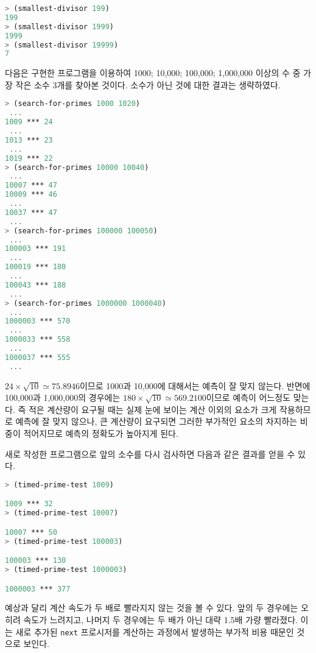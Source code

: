 
\begin{lstlisting}[language=Scheme]
> (smallest-divisor 199)
199
> (smallest-divisor 1999)
1999
> (smallest-divisor 19999)
7
\end{lstlisting}


다음은 구현한 프로그램을 이용하여 1000; 10,000; 100,000; 1,000,000 이상의 수
중 가장 작은 소수 3개를 찾아본 것이다. 소수가 아닌 것에 대한 결과는 생략하였다.
\begin{lstlisting}[language=Scheme]
> (search-for-primes 1000 1020)
 ...
1009 *** 24
 ...
1013 *** 23
 ...
1019 *** 22
> (search-for-primes 10000 10040)
 ...
10007 *** 47
10009 *** 46
 ...
10037 *** 47
 ...
> (search-for-primes 100000 100050)
 ...
100003 *** 191
 ...
100019 *** 180
 ...
100043 *** 188
 ...
> (search-for-primes 1000000 1000040)
 ...
1000003 *** 570
 ...
1000033 *** 558
 ...
1000037 *** 555
 ...
\end{lstlisting}
$24 \times \sqrt{10} \simeq 75.8946$이므로 1000과 10,000에 대해서는 예측이 잘
맞지 않는다. 반면에 100,000과 1,000,000의 경우에는 $180 \times \sqrt{10}
\simeq 569.2100$이므로 예측이 어느정도 맞는다. 즉 적은 계산량이 요구될 때는
실제 눈에 보이는 계산 이외의 요소가 크게 작용하므로 예측에 잘 맞지 않으나, 큰
계산량이 요구되면 그러한 부가적인 요소의 차지하는 비중이 적어지므로 예측의 정확도가
높아지게 된다.


새로 작성한 프로그램으로 앞의 소수를 다시 검사하면 다음과 같은 결과를 얻을 수
있다.
\begin{lstlisting}[language=Scheme]
> (timed-prime-test 1009)

1009 *** 32
> (timed-prime-test 10007)

10007 *** 50
> (timed-prime-test 100003)

100003 *** 130
> (timed-prime-test 1000003)

1000003 *** 377
\end{lstlisting}

예상과 달리 계산 속도가 두 배로 빨라지지 않는 것을 볼 수 있다. 앞의 두
경우에는 오히려 속도가 느려지고, 나머지 두 경우에는 두 배가 아닌 대략 1.5배
가량 빨라졌다. 이는 새로 추가된 \texttt{next} 프로시저를 계산하는 과정에서
발생하는 부가적 비용 때문인 것으로 보인다.

